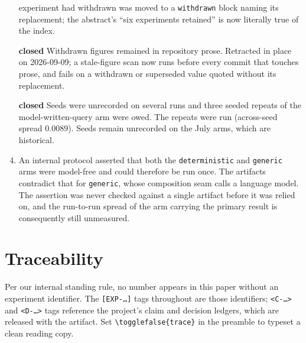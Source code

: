 \documentclass{article}
\newcommand{\expref}[1]{\iftoggle{trace}{\,{\scriptsize\textcolor{gray}{\texttt{[#1]}}}}{}}
\begin{document}
\begin{enumerate}
      experiment had withdrawn was moved to a \texttt{withdrawn} block naming its
      replacement; the abstract's ``six experiments retained'' is now literally
      true of the index.
\item[\textbf{closed}] Withdrawn figures remained in repository prose. Retracted
      in place on 2026-09-09; a stale-figure scan now runs before every commit
      that touches prose, and fails on a withdrawn or superseded value quoted
      without its replacement.
\item[\textbf{closed}] Seeds were unrecorded on several runs and three seeded
      repeats of the model-written-query arm were owed. The repeats were run
      (across-seed spread $0.0089$).\expref{EXP-2026-09-009} Seeds remain
      unrecorded on the July arms, which are historical.
\item An internal protocol asserted that both the \texttt{deterministic} and
      \texttt{generic} arms were model-free and could therefore be run once. The
      artifacts contradict that for \texttt{generic}, whose composition seam
      calls a language model. The assertion was never checked against a single
      artifact before it was relied on, and the run-to-run spread of the arm
      carrying the primary result is consequently still
      unmeasured.\expref{EXP-2026-09-010}
\end{enumerate}

\section{Traceability}

Per our internal standing rule, no number appears in this paper without an
experiment identifier. The \texttt{[EXP-\dots]} tags throughout are those
identifiers; \texttt{<C-\dots>} and \texttt{<D-\dots>} tags reference the
project's claim and decision ledgers, which are released with the artifact. Set
\texttt{\textbackslash togglefalse\{trace\}} in the preamble to typeset a clean
reading copy.
\end{document}
